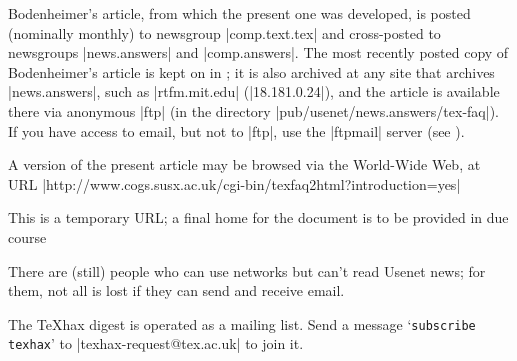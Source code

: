 Bodenheimer's article, from which the present one was developed, is
posted (nominally monthly) to newsgroup
\Newsgroup|comp.text.tex| and cross-posted to newsgroups
\Newsgroup|news.answers| and \Newsgroup|comp.answers|. The most
recently posted copy of Bodenheimer's article is kept on  in
; it is also archived at any site that archives
\Newsgroup|news.answers|, such as \FTP|rtfm.mit.edu|
(\FTP|18.181.0.24|), and the article is available there
via anonymous |ftp| (in the directory
\File|pub/usenet/news.answers/tex-faq|). If you have access to email,
but not to |ftp|, use the \Package|ftpmail| server
(see ).

\htmlignore
A version of the present article may be browsed via the World-Wide Web, at URL
\URL|http://www.cogs.susx.ac.uk/cgi-bin/texfaq2html?introduction=yes|%
\begin{footnoteenv}
This is a temporary URL; a final home for the document is to be
provided in due course
\end{footnoteenv}
\endhtmlignore




There are (still) people who can use networks but can't read Usenet
news; for them, not all is lost if they can send and receive email.

The \TeX{}hax digest is operated as a
mailing list.  Send a message `\texttt{subscribe texhax}' to
\Email|texhax-request@tex.ac.uk| to join it.

